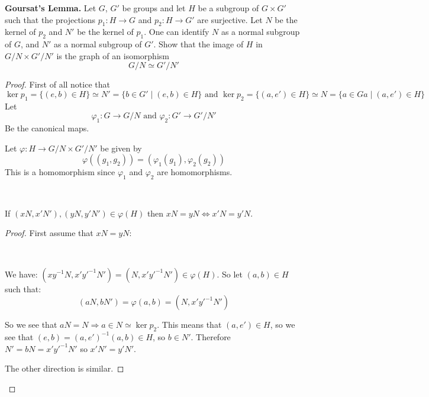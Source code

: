     \begin{exercise}


        \textbf{Goursat's Lemma.} Let $G$, $G'$ be groups and let $H$ be a subgroup of $G\times G'$ such that the projections $p_1\colon H\rightarrow G$ and $p_2\colon H\rightarrow G'$ are surjective. Let $N$ be the kernel of $p_2$ and $N'$ be the kernel of $p_1$. One can identify $N$ as a normal subgroup of $G$, and $N'$ as a normal subgroup of $G'$. Show that the image of $H$ in $G/N\times G'/N'$ is the graph of an isomorphism \[G/N\simeq G'/N'\]
    
    \begin{proof}
        First of all notice that \begin{equation*}
            \ker p_1 = \{(e,b)\in H\}\simeq N' = \{b\in G' \mid (e,b)\in H\}\text{ and }\ker p_2 = \{(a,e')\in H\} \simeq N = \{a\in Ga \mid (a,e')\in H\}
        \end{equation*} 
        Let \begin{equation*}
            \varphi_1\colon G\rightarrow G/N \text{ and } \varphi_2\colon G'\rightarrow G'/N'
        \end{equation*}
        Be the canonical maps.

        Let $\varphi\colon H\rightarrow G/N\times G'/N'$ be given by \[\varphi((g_1,g_2)) = (\varphi_1(g_1),\varphi_2(g_2)) \]
        This is a homomorphism since $\varphi_1$ and $\varphi_2$ are homomorphisms.

        \
        \begin{lemma} \label{lem1}
            If $(xN,x'N'), (yN,y'N')\in \varphi(H)$ then $xN = yN \iff x'N = y'N$.    
        \end{lemma}
        \begin{proof}
        First assume that $xN = yN$:

        \
        
        We have: $(xy^{-1}N,{x'}{y'}^{-1}N') = (N,{x'}{y'}^{-1}N') \in \varphi(H)$. So let $(a,b)\in H$ such that:\begin{equation*}
            (aN,bN') = \varphi(a,b) = (N,{x'}{y'}^{-1}N')
        \end{equation*}
    
        So we see that $aN = N \Rightarrow a\in N \simeq \ker p_2$. This means that $(a,e')\in H$, so we see that $(e,b) = (a,e')^{-1}(a,b)\in H$, so $b\in N'$. Therefore $N' = bN = {x'}{y'}^{-1}N'$ so $x'N' = y'N'$.

        The other direction is similar.
        \end{proof}


\end{proof}
\end{exercise}
